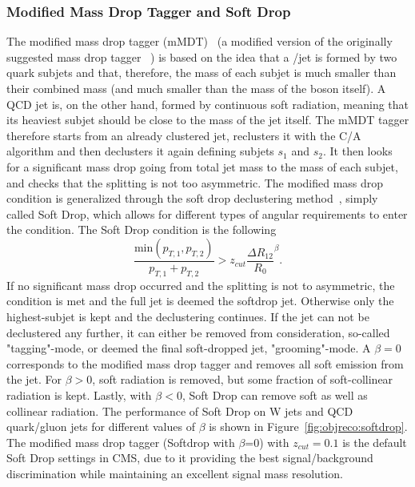 \subsubsection{Modified Mass Drop Tagger and Soft Drop}
\label{sec:objreco:softdrop}
The modified mass drop tagger (mMDT)~\cite{Dasgupta:2013ihk} (a modified version of the originally suggested mass drop tagger ~\cite{Butterworth:2008iy}) is based on the idea that a \PW/\PZ jet is formed by two quark subjets and that, therefore, the mass of each subjet is much smaller than their combined mass (and much smaller than the mass of the boson itself). A QCD jet is, on the other hand, formed by continuous soft radiation, meaning that its heaviest subjet should be close to the mass of the jet itself. The mMDT tagger therefore starts from an already clustered jet, reclusters it with the C/A algorithm and then declusters it again defining subjets $s_1$ and $s_2$. It then looks for a significant mass drop going from total jet mass to the mass of each subjet, and checks that the splitting is not too asymmetric. The modified mass drop condition is generalized through the soft drop declustering method~\cite{Larkoski:2014wba}, simply called Soft Drop, which allows for different types of angular requirements to enter the condition. The Soft Drop condition is the following
\begin{equation*}
\frac{ \textrm{min}(p_{T,1},p_{T,2}) }{ p_{T,1}+p_{T,2} } > z_{cut} \frac{\Delta R_{12}}{R_0}^\beta.
\end{equation*}
If no significant mass drop occurred and the splitting is not to asymmetric, the condition is met and the full jet is deemed the softdrop jet. Otherwise only the highest-\PT subjet is kept and the declustering continues. If the jet can not be declustered any further, it can either be removed from consideration, so-called "tagging"-mode, or deemed the final soft-dropped jet, "grooming"-mode. A $\beta=0$ corresponds to the modified mass drop tagger and removes all soft emission from the jet. For $\beta>0$, soft radiation is removed, but some fraction of soft-collinear radiation is kept. Lastly, with $\beta<0$, Soft Drop can remove soft as well as collinear radiation.
The performance of Soft Drop on W jets and QCD quark/gluon jets for different values of $\beta$ is shown in Figure~\ref{fig:objreco:softdrop}. The modified mass drop tagger (Softdrop with $\beta$=0) with $z_{cut} = 0.1$ is the default Soft Drop settings in CMS, due to it providing the best signal/background discrimination while maintaining an excellent signal mass resolution. 


